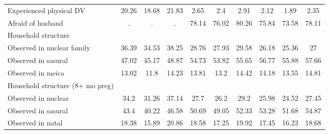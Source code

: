 \begin{tabular}{l*{9}{c}}
Experienced physical DV&       20.26&       18.68&       21.83&        2.65&         2.4&        2.91&        2.12&        1.89&        2.35\\
Afraid of husband   &           .&           .&           .&       78.14&       76.02&       80.26&       75.84&       73.58&       78.11\\
\midrule
Household structure &            &            &            &            &            &            &            &            &            \\
Observed in nuclear family&       36.39&       34.53&       38.25&       28.76&       27.93&       29.58&       26.18&       25.36&          27\\
Observed in sasural &       47.02&       45.17&       48.87&       54.73&       53.82&       55.65&       56.77&       55.88&       57.66\\
Observed in meica   &       13.02&        11.8&       14.23&       13.81&        13.2&       14.42&       14.18&       13.55&       14.81\\
\midrule
Household structure (8+ mo preg)&            &            &            &            &            &            &            &            &            \\
Observed in nuclear &        34.2&       31.26&       37.14&        27.7&        26.2&        29.2&       25.98&       24.52&       27.45\\
Observed in sasural &        43.4&       40.22&       46.58&       50.69&       49.05&       52.33&       53.28&       51.68&       54.87\\
Observed in natal   &       18.38&       15.89&       20.86&       18.58&       17.25&       19.92&       17.45&       16.23&       18.68\\
\bottomrule
\end{tabular}
